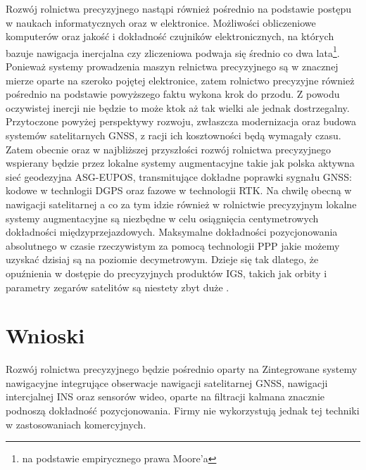 \indent	Rozwój rolnictwa precyzyjnego nastąpi również pośrednio na podstawie postępu w naukach informatycznych oraz w elektronice. Możliwości 
obliczeniowe komputerów oraz jakość i dokładność czujników elektronicznych, na których bazuje nawigacja inercjalna czy zliczeniowa podwaja się średnio co dwa lata\footnote{
na podstawie empirycznego prawa Moore'a}. Ponieważ systemy prowadzenia maszyn relnictwa precyzyjnego są w znacznej mierze oparte na szeroko pojętej elektronice, zatem 
rolnictwo precyzyjne również pośrednio na podstawie powyższego faktu wykona krok do przodu. Z powodu oczywistej inercji nie będzie to może ktok aż tak wielki ale jednak
dostrzegalny.\newline
\indent Przytoczone powyżej perspektywy rozwoju, zwłaszcza modernizacja oraz budowa systemów satelitarnych GNSS, z racji ich kosztowności będą wymagały 
czasu. Zatem obecnie oraz w najbliższej przyszłości rozwój rolnictwa precyzyjnego wspierany będzie przez lokalne systemy augmentacyjne takie jak polska 
aktywna sieć geodezyjna ASG-EUPOS, transmitujące dokładne poprawki sygnału GNSS: kodowe w technlogii DGPS oraz fazowe w technologii RTK.
Na chwilę obecną w nawigacji satelitarnej a co za tym idzie również w rolnictwie precyzyjnym lokalne systemy augmentacyjne są niezbędne w celu osiągnięcia 
centymetrowych dokładności międzyprzejazdowych. Maksymalne dokładności pozycjonowania absolutnego w czasie rzeczywistym za pomocą technologii PPP jakie możemy
uzyskać dzisiaj są na poziomie decymetrowym. Dzieje się tak dlatego, że opuźnienia w dostępie do precyzyjnych produktów IGS, takich jak orbity i parametry 
zegarów satelitów są niestety zbyt duże \cite[][strona 215]{ggos}.

\section{Wnioski}
Rozwój rolnictwa precyzyjnego będzie pośrednio oparty na 
Zintegrowane systemy nawigacyjne integrujące obserwacje nawigacji satelitarnej GNSS, nawigacji intercjalnej INS oraz sensorów wideo, oparte na filtracji
kalmana znacznie podnoszą dokładność pozycjonowania. Firmy nie wykorzystują jednak tej techniki w zastosowaniach komercyjnych.  
